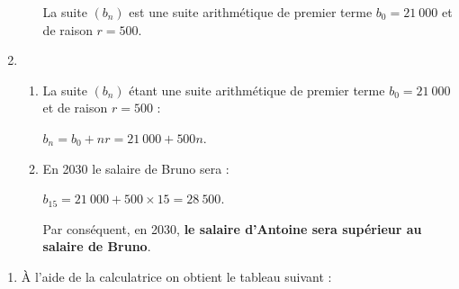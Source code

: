 \begin{corrige}
\begin{enumerate}
\begin{enumerate}[label=\alph*.]
               La suite $(b_n)$ est une suite arithmétique de premier terme ${b_0=21\ 000}$ et de raison ${r=500}$.
          \end{enumerate}
          \par
          \item %

          \begin{enumerate}[label=\alph*.]

               \item %
               La suite $(b_n)$ étant une suite arithmétique de premier terme ${b_0=21\ 000}$ et de raison ${r=500}$ :
               \par
               $b_n=b_0+nr=21\ 000+500n$.
               \item %
               En 2030 le salaire de Bruno sera :
               \par
               $b_{15}=21~000 + 500 \times 15 = 28~500$.
               \par
               Par conséquent, en 2030, \textbf{le salaire d'Antoine sera supérieur au salaire de Bruno}.
               \par
          \end{enumerate}
          \par
     \end{enumerate}
     \par
     \par
     \begin{enumerate}
          \item \`A l'aide de la calculatrice on obtient le tableau suivant :
          \par
          \begin{tabular}{|c|c|c|c|c|c|c|}\hline  %

\end{tabular}
\end{enumerate}
\end{corrige}
